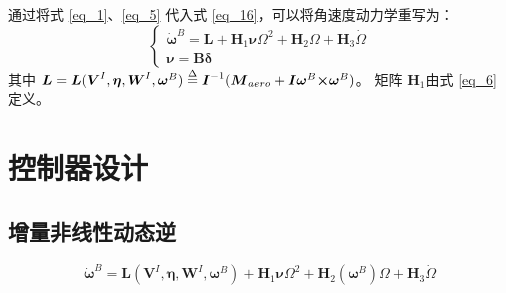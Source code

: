 通过将式 \eqref{eq_1}、\eqref{eq_5} 代入式 \eqref{eq_16}，可以将角速度动力学重写为：
\begin{equation}
	\left\{ \begin{array}{l}
	{{{\boldsymbol{\dot \omega }}}^B} = {\boldsymbol{L}} + {{\boldsymbol{H}}_1}{\boldsymbol{\nu }}{\Omega ^2} + {{\boldsymbol{H}}_2}\Omega  + {{\boldsymbol{H}}_3}\dot \Omega \\
	{\boldsymbol{\nu }} = {\boldsymbol{B\delta }}
	\end{array} \right.
	\label{eq_17}
\end{equation}
其中 ${\boldsymbol{L}} = {\boldsymbol{L}}({{\boldsymbol{V}}^I},{\boldsymbol{\eta}},{{\boldsymbol{W}}^I} ,{{\boldsymbol{\omega }}^B}) \buildrel \Delta \over = {{\boldsymbol{I}}^{ - 1}}({{\boldsymbol{M}}_{aero}} + {\boldsymbol{I}}{{\boldsymbol{\omega }}^B}{\boldsymbol{ \times }}{{\boldsymbol{\omega }}^B})$。 矩阵 ${{\boldsymbol{H}}_{1}}$由式 \eqref{eq_6}  定义。

\section{控制器设计}

\subsection{增量非线性动态逆}

\begin{equation}
	{{\boldsymbol{\dot \omega }}^B} = {\boldsymbol{L}}({{\boldsymbol{V}}^I},{\boldsymbol{\eta }},{{\boldsymbol{W}}^I},{{\boldsymbol{\omega }}^B}) + {{\boldsymbol{H}}_1}{\boldsymbol{\nu }}{\Omega ^2} + {{\boldsymbol{H}}_2}({{\boldsymbol{\omega }}^B})\Omega  + {{\boldsymbol{H}}_3}\dot \Omega
	\label{eq_18}
\end{equation}

